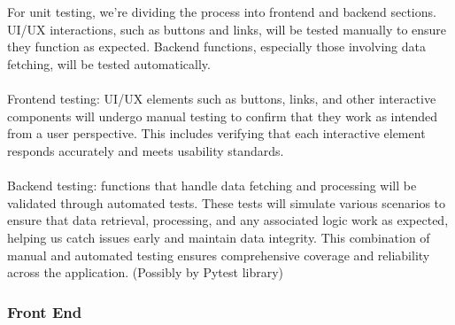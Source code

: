 \documentclass[12pt, titlepage]{article}
\begin{document}
\\\\
For unit testing, we’re dividing the process into frontend and backend sections. UI/UX interactions, such as buttons and links, will be tested manually to ensure they function as expected. Backend functions, especially those involving data fetching, will be tested automatically.\\\\
Frontend testing: UI/UX elements such as buttons, links, and other interactive components will undergo manual testing to confirm that they work as intended from a user perspective. This includes verifying that each interactive element responds accurately and meets usability standards.\\\\
Backend testing: functions that handle data fetching and processing will be validated through automated tests. These tests will simulate various scenarios to ensure that data retrieval, processing, and any associated logic work as expected, helping us catch issues early and maintain data integrity. This combination of manual and automated testing ensures comprehensive coverage and reliability across the application. (Possibly by Pytest library)

\subsubsection{Front End}
\end{document}
